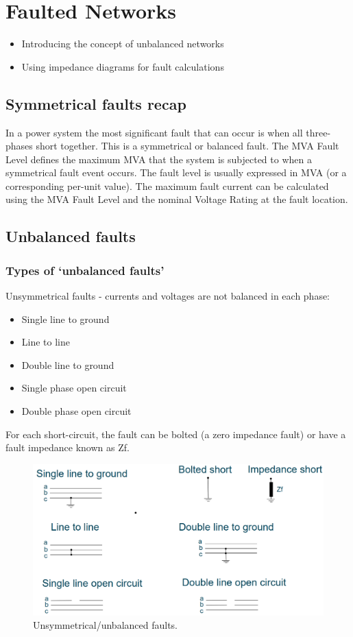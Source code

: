 \chapter{Faulted Networks}
\begin{itemize}
	\item Introducing the concept of unbalanced networks
	\item Using impedance diagrams for fault calculations
\end{itemize}
\section{Symmetrical faults recap}
In a power system the most significant fault that can occur is when all three-phases short together. This is a symmetrical or balanced fault. The MVA Fault Level defines the maximum MVA that the system is subjected to when a symmetrical fault event occurs. The fault level is usually expressed in MVA (or a corresponding per-unit value). The maximum fault current can be calculated using the MVA Fault Level and the nominal Voltage Rating at the fault location.
\section{Unbalanced faults}
\subsection{Types of `unbalanced faults'}
Unsymmetrical faults - currents and voltages are not balanced in each phase:
\begin{itemize}
	\item Single line to ground
	\item Line to line
	\item Double line to ground
	\item Single phase open circuit
	\item Double phase open circuit
\end{itemize}
For each short-circuit, the fault can be bolted (a zero impedance fault) or have a fault impedance known as Zf.
\begin{figure}[H]
	\centering
	\includegraphics[width = \textwidth]{./img/figure20.png}
	\caption{Unsymmetrical/unbalanced faults.}
\end{figure}
